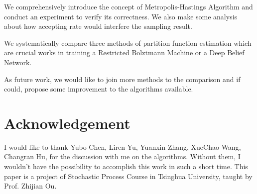 \documentclass{sig-alternate-05-2015}
\begin{document}
We comprehensively introduce the concept of Metropolis-Hastings Algorithm and conduct an experiment to verify its correctness. We also make some analysis about how accepting rate would interfere the sampling result.

We systematically compare three methods of partition function estimation which are crucial works in training a Restricted Bolztmann Machine or a Deep Belief Network. 

As future work, we would like to join more methods to the comparison and if could, propose some improvement to the algorithms available.


\renewcommand{\baselinestretch}{1.1}
\balance

\small

\section{Acknowledgement} \label{sec:acknowledgement}
I would like to thank Yubo Chen, Liren Yu, Yuanxin Zhang, XueChao Wang, Changran Hu, for the discussion with me on the algorithms. Without them, I wouldn't have the possibility to accomplish this work in such a short time. This paper is a project of Stochastic Process Course in Tsinghua University, taught by Prof. Zhijian Ou.




	
\end{document}
